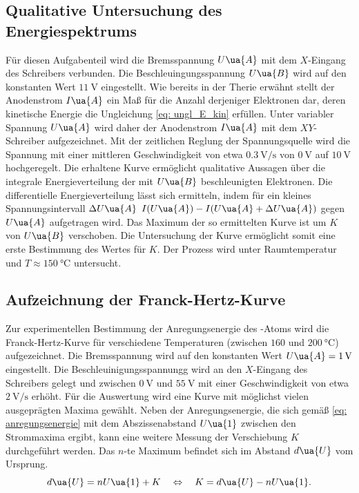 \subsection{Qualitative Untersuchung des Energiespektrums}
Für diesen Aufgabenteil wird die Bremsspannung $U\ua{A}$ mit dem $X$-Eingang des Schreibers verbunden. Die
Beschleuingungsspannung $U\ua{B}$ wird auf den konstanten Wert $\SI{11}{\volt}$ eingestellt.
Wie bereits
in der Therie erwähnt stellt der Anodenstrom $I\ua{A}$ ein Maß für die Anzahl derjeniger Elektronen dar, deren
kinetische Energie die Ungleichung \eqref{eq: ungl_E_kin} erfüllen.
Unter variabler Spannung $U\ua{A}$ wird daher der Anodenstrom $I\ua{A}$ mit dem $XY$-Schreiber aufgezeichnet.
Mit der zeitlichen Reglung der Spannungsquelle wird die Spannung mit einer mittleren Geschwindigkeit von etwa
$\SI{0.3}{\volt \per\second}$ von $\SI{0}{\volt}$ auf $\SI{10}{\volt}$ hochgeregelt. Die erhaltene Kurve ermöglicht
qualitative Aussagen über die integrale Energieverteilung der mit $U\ua{B}$ beschleunigten Elektronen.
Die differentielle Energieverteilung lässt sich ermitteln, indem für ein kleines Spannungsintervall
$\Delta U\ua{A}$ $I(U\ua{A}) - I(U\ua{A} + \Delta U\ua{A})$ gegen $U\ua{A}$ aufgetragen wird. Das Maximum
der so ermittelten Kurve ist um $K$ von $U\ua{B}$ verschoben. Die Untersuchung der Kurve ermöglicht somit eine
erste Bestimmung des Wertes für $K$.
Der Prozess wird unter Raumtemperatur und $T \approx \SI{150}{\celsius}$ untersucht.

\subsection{Aufzeichnung der Franck-Hertz-Kurve}
Zur experimentellen Bestimmung der Anregungsenergie des -Atoms wird die Franck-Hertz-Kurve für
verschiedene Temperaturen (zwischen $\num{160}$ und $\SI{200}{\celsius}$) aufgezeichnet.
Die Bremsspannung wird auf den konstanten Wert $U\ua{A} = \SI{1}{\volt}$ eingestellt.
Die Beschleuinigungsspannungg wird an den $X$-Eingang des Schreibers gelegt und zwischen $\SI{0}{\volt}$
und $\SI{55}{\volt}$ mit einer Geschwindigkeit von etwa $\SI{2}{\volt \per\second}$ erhöht. Für die
Auswertung wird eine Kurve mit möglichst vielen ausgeprägten Maxima gewählt. Neben der Anregungsenergie,
die sich gemäß \ref{eq: anregungsenergie} mit dem Abszissenabstand $U\ua{1}$ zwischen den Strommaxima ergibt,
kann eine weitere Messung der Verschiebung
$K$ durchgeführt werden. Das $n$-te Maximum befindet sich im Abstand $d\ua{U}$ vom Ursprung.
\begin{equation}
  d\ua{U} = nU\ua{1} + K \quad \Leftrightarrow \quad K = d\ua{U}- n U\ua{1}.
  \label{eq: k_franck}
\end{equation}

